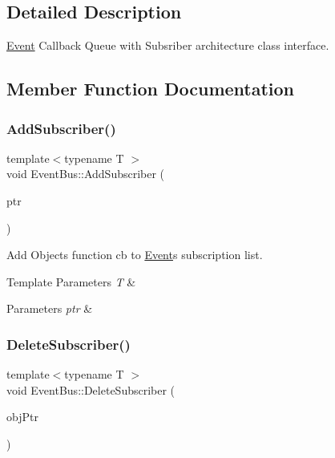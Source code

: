 \subsection{Detailed Description}
\hyperlink{classEvent}{Event} Callback Queue with Subsriber architecture class interface. 

\subsection{Member Function Documentation}
\mbox{\label{classEventBus_aa979b8cf93f0bb8bf50d07422a3b15fe}} 
\subsubsection{\texorpdfstring{Add\+Subscriber()}{AddSubscriber()}}
{\footnotesize\ttfamily template$<$typename T $>$ \\
void Event\+Bus\+::\+Add\+Subscriber (\begin{DoxyParamCaption}\item[{const \hyperlink{classEventCallback}{Event\+Callback}$<$ T $>$ \&}]{ptr }\end{DoxyParamCaption})}



Add Object\textquotesingle{}s function cb to \hyperlink{classEvent}{Event}\textquotesingle{}s subscription list. 


\begin{DoxyTemplParams}{Template Parameters}
{\em T} & \\
\hline
\end{DoxyTemplParams}

\begin{DoxyParams}{Parameters}
{\em ptr} & \\
\hline
\end{DoxyParams}
\mbox{\label{classEventBus_a59c30ad63d7daf82be43df5de1427bdb}} 
\subsubsection{\texorpdfstring{Delete\+Subscriber()}{DeleteSubscriber()}}
{\footnotesize\ttfamily template$<$typename T $>$ \\
void Event\+Bus\+::\+Delete\+Subscriber (\begin{DoxyParamCaption}\item[{void $\ast$}]{obj\+Ptr }\end{DoxyParamCaption})}



